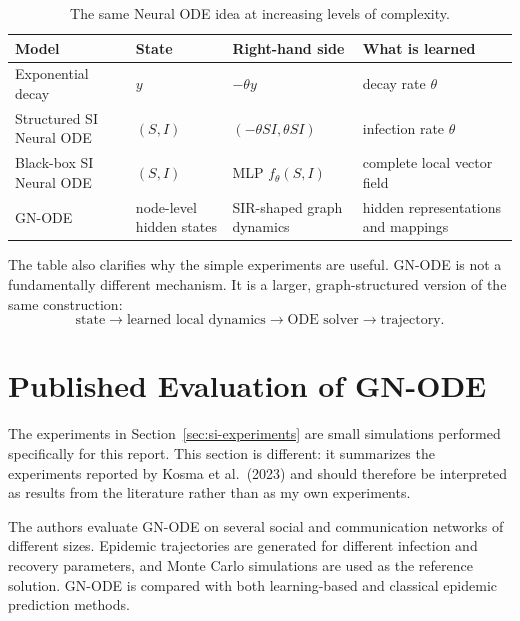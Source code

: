 \documentclass[11pt,a4paper]{article}
\begin{document}
\begin{table}[h]
\centering
\small
\begin{tabularx}{\textwidth}{lXXX}
\toprule
Model & State & Right-hand side & What is learned\\
\midrule
Exponential decay
&
$y$
&
$-\theta y$
&
decay rate $\theta$
\\

Structured SI Neural ODE
&
$(S,I)$
&
$(-\theta SI,\theta SI)$
&
infection rate $\theta$
\\

Black-box SI Neural ODE
&
$(S,I)$
&
MLP $f_\theta(S,I)$
&
complete local vector field
\\

GN-ODE
&
node-level hidden states
&
SIR-shaped graph dynamics
&
hidden representations and mappings
\\
\bottomrule
\end{tabularx}
\caption{The same Neural ODE idea at increasing levels of complexity.}
\label{tab:progression}
\end{table}

The table also clarifies why the simple experiments are useful. GN-ODE is not
a fundamentally different mechanism. It is a larger, graph-structured version
of the same construction:
\[
    \text{state}
    \rightarrow
    \text{learned local dynamics}
    \rightarrow
    \text{ODE solver}
    \rightarrow
    \text{trajectory}.
\]


\section{Published Evaluation of GN-ODE}
\label{sec:published-results}

The experiments in Section~\ref{sec:si-experiments} are small simulations
performed specifically for this report. This section is different: it
summarizes the experiments reported by Kosma et al.\ (2023) and should
therefore be interpreted as results from the literature rather than as my own
experiments.

The authors evaluate GN-ODE on several social and communication networks of
different sizes. Epidemic trajectories are generated for different infection
and recovery parameters, and Monte Carlo simulations are used as the reference
solution. GN-ODE is compared with both learning-based and classical epidemic
prediction methods.
\end{document}
